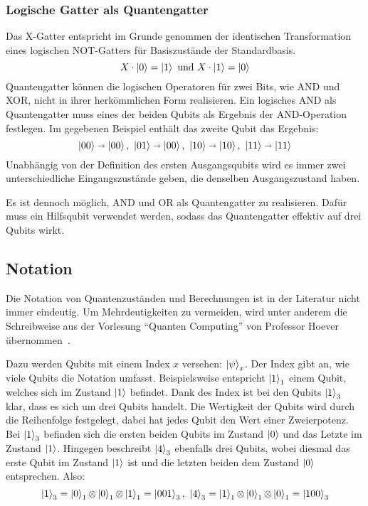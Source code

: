 \subsubsection*{Logische Gatter als Quantengatter} 
Das X-Gatter entspricht im Grunde genommen der identischen Transformation eines logischen NOT-Gatters für Basiszustände der Standardbasis.
\[
  X \cdot \ket{0} = \ket{1} 
  \text{ und }
  X \cdot \ket{1} = \ket{0}
\]
Quantengatter können die logischen Operatoren für zwei Bits, wie AND und XOR, 
nicht in ihrer herkömmlichen Form realisieren. 
Ein logisches AND als Quantengatter muss eines der beiden Qubits als Ergebnis der AND-Operation festlegen.
Im gegebenen Beispiel enthält das zweite Qubit das Ergebnis:
\[
  \ket{00} \shortrightarrow \ket{00} 
  \text{, } 
  \ket{01} \shortrightarrow \ket{00}
  \text{, }
  \ket{10} \shortrightarrow \ket{10}
  \text{, }
  \ket{11} \shortrightarrow \ket{11}
  \]
Unabhängig von der Definition des ersten Ausgangsqubits wird es immer zwei unterschiedliche Eingangszustände geben, 
die denselben Ausgangszustand haben. 

Es ist dennoch möglich, 
AND und OR als Quantengatter zu realisieren. 
Dafür muss ein Hilfsqubit verwendet werden, sodass das Quantengatter effektiv auf drei Qubits wirkt.

\subsection{Notation}
Die Notation von Quantenzuständen und Berechnungen ist in der Literatur nicht immer eindeutig. 
Um Mehrdeutigkeiten zu vermeiden, wird unter anderem die Schreibweise aus der Vorlesung "`Quanten Computing"' 
von Professor Hoever übernommen~\cite{Hoever2023QC}.

Dazu werden Qubits mit einem Index \(x\) versehen: \(\ket{\psi}_x\). 
Der Index gibt an, wie viele Qubits die Notation umfasst. 
Beispielsweise entspricht \(\ket{1}_1\) einem Qubit, 
welches sich im Zustand \(\ket{1}\) befindet.
Dank des Index ist bei den Qubits \(\ket{1}_3\) klar, 
dass es sich um drei Qubits handelt. 
Die Wertigkeit der Qubits wird durch die Reihenfolge festgelegt, 
dabei hat jedes Qubit den Wert einer Zweierpotenz.
Bei \(\ket{1}_3\) befinden sich die ersten beiden Qubits im Zustand \(\ket{0}\) und das Letzte im Zustand \(\ket{1}\).
Hingegen beschreibt \(\ket{4}_3\) ebenfalls drei Qubits, 
wobei diesmal das erste Qubit im Zustand \(\ket{1}\) ist und die letzten beiden dem Zustand \(\ket{0}\) entsprechen.
Also:
\[\ket{1}_3 = \ket{0}_1 \operatorname{\otimes} \ket{0}_1 \operatorname{\otimes} \ket{1}_1 = \ket{001}_3,~
\ket{4}_3 = \ket{1}_1 \operatorname{\otimes} \ket{0}_1 \operatorname{\otimes} \ket{0}_1 = \ket{100}_3\]

